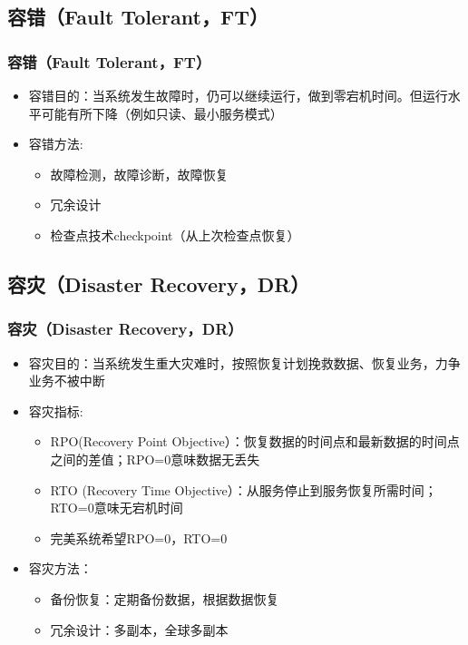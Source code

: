 \subsection{容错（Fault Tolerant，FT）} %
\begin{frame}[fragile]
    \frametitle{容错（Fault Tolerant，FT）}
\begin{itemize}
    \item 容错目的：当系统发生故障时，仍可以继续运行，做到零宕机时间。但运行水平可能有所下降（例如只读、最小服务模式） \pause
    \item 容错方法: 
 \begin{itemize}
    \item 故障检测，故障诊断，故障恢复
    \item 冗余设计
    \item 检查点技术checkpoint（从上次检查点恢复）
\end{itemize}  
\end{itemize}
\end{frame}



\subsection{容灾（Disaster Recovery，DR）} %
\begin{frame}[fragile]
    \frametitle{容灾（Disaster Recovery，DR）}
\begin{itemize}
    \item 容灾目的：当系统发生重大灾难时，按照恢复计划挽救数据、恢复业务，力争业务不被中断 \pause
    \item 容灾指标: 
 \begin{itemize}
    \item RPO(Recovery Point Objective）：恢复数据的时间点和最新数据的时间点之间的差值；RPO=0意味数据无丢失
    \item RTO (Recovery Time Objective）：从服务停止到服务恢复所需时间；RTO=0意味无宕机时间
    \item 完美系统希望RPO=0，RTO=0
\end{itemize}  \pause
   \item 容灾方法：
 \begin{itemize}
    \item 备份恢复：定期备份数据，根据数据恢复
    \item 冗余设计：多副本，全球多副本
\end{itemize} 
\end{itemize}
\end{frame}


